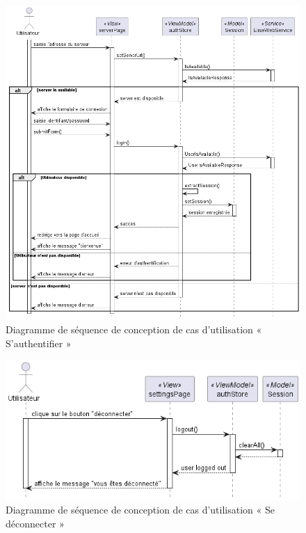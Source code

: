 \begin{figure}[H]
  \centering
  \includegraphics[width=1\textwidth]{out/diagrams/authentification/sequence_simple_login/sequence_simple_login}
  \caption{Diagramme de séquence de conception de cas d'utilisation « S'authentifier »}
  \label{fig:sequence_conception_login}
\end{figure}

\begin{figure}[H]
  \centering
  \includegraphics[width=1\textwidth]{out/diagrams/authentification/sequence_logout/sequence_logout}
  \caption{Diagramme de séquence de conception de cas d'utilisation « Se déconnecter »}
  \label{fig:sequence_conception_logout}
\end{figure}

